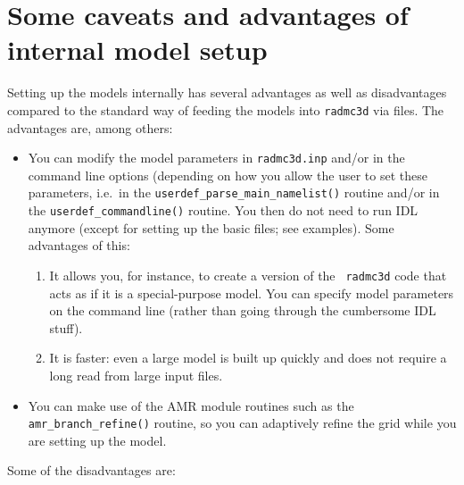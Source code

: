 \documentclass{report}
\begin{document}
\section{Some caveats and advantages of internal model setup}
\label{sec-internalsetup-proscons}
Setting up the models internally has several advantages as well as
disadvantages compared to the standard way of feeding the models into 
{\small\tt radmc3d} via files. The advantages are, among others:
\begin{itemize}
\item You can modify the model parameters in {\small\tt radmc3d.inp} and/or in
  the command line options (depending on how you allow the user to set these
  parameters, i.e.\ in the {\small\tt userdef\_parse\_main\_namelist()}
  routine and/or in the {\small\tt userdef\_commandline()} routine. You then
  do not need to run IDL anymore (except for setting up the basic files; see
  examples). Some advantages of this:
  \begin{enumerate}
  \item It allows you, for instance, to create a version of the {\small\tt
      radmc3d} code that acts as if it is a special-purpose model. You can
    specify model parameters on the command line (rather than going through
    the cumbersome IDL stuff).
    \item It is faster: even a large model is built up quickly and does not
      require a long read from large input files. 
  \end{enumerate}
\item You can make use of the AMR module routines such as the {\small\tt
    amr\_branch\_refine()} routine, so you can adaptively refine the grid
  while you are setting up the model.
\end{itemize}
Some of the disadvantages are:
\end{document}
